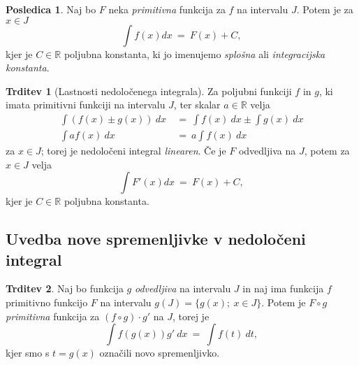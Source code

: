 \documentclass[11pt]{article}
\theoremstyle{definition}
\theoremstyle{definition}
\newtheorem{trditev}{Trditev}[section]
\theoremstyle{definition}
\theoremstyle{theorem}
\newtheorem*{posledica}{Posledica}
\begin{document}
\begin{posledica}

Naj bo $F$ neka \textit{primitivna} funkcija za $f$ na intervalu $J$. Potem je za $x \in J$
$$\int f(x) dx ~=~ F(x) + C,$$
kjer je $C \in \mathbb{R}$ poljubna konstanta, ki jo imenujemo \textit{splošna} ali \textit{integracijska konstanta}.

\end{posledica}
\vspace{0.5cm}

\begin{trditev}[Lastnosti nedoločenega integrala]

Za poljubni funkciji $f$ in $g$, ki imata primitivni funkciji na intervalu $J$, ter skalar $a \in \mathbb{R}$ velja
\begin{align*}
\int \left( f(x) \pm g(x) \right)~dx ~&=~ \int f(x)~dx \pm \int g(x)~dx \\
\int a f(x)~dx ~&=~ a \int f(x)~dx
\end{align*}
za $x \in J$; torej je nedoločeni integral \textit{linearen}. Če je $F$ odvedljiva na $J$, potem za $x \in J$ velja
$$\int F'(x) dx ~=~ F(x) + C,$$
kjer je $C \in \mathbb{R}$ poljubna konstanta.

\end{trditev}
\vspace{0.5cm}


\subsection{Uvedba nove spremenljivke v nedoločeni integral}
\vspace{0.5cm}

\begin{trditev}

Naj bo funkcija $g$ \textit{odvedljiva} na intervalu $J$ in naj ima funkcija $f$ primitivno funkcijo $F$ na intervalu $g(J) = \{ g(x); ~x \in J \}$. Potem je $F \circ g$ \textit{primitivna} funkcija za $(f \circ g) \cdot g'$ na $J$, torej je
$$\int f \left( g(x) \right) g'~dx ~=~ \int f(t)~dt,$$
kjer smo s $t = g(x)$ označili novo spremenljivko.

\end{trditev}
\vspace{0.5cm}

\end{document}
